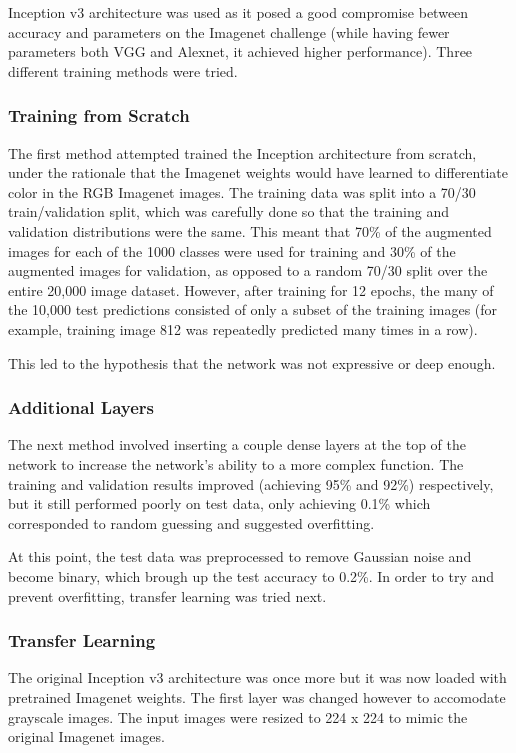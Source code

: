 \documentclass{article}
\begin{document}
Inception v3 architecture was used as it posed a good compromise between accuracy and parameters on the Imagenet challenge (while having fewer parameters both VGG and Alexnet, it achieved higher performance). Three different training methods were tried.

\subsubsection{Training from Scratch}

The first method attempted trained the Inception architecture from scratch, under the rationale that the Imagenet weights would have learned to differentiate color in the RGB Imagenet images. The training data was split into a 70/30 train/validation split, which was carefully done so that the training and validation distributions were the same. This meant that 70\% of the augmented images for each of the 1000 classes were used for training and 30\% of the augmented images for validation, as opposed to a random 70/30 split over the entire 20,000 image dataset. However, after training for 12 epochs, the many of the 10,000 test predictions consisted of only a subset of the training images (for example, training image 812 was repeatedly predicted many times in a row).

This led to the hypothesis that the network was not expressive or deep enough.

\subsubsection{Additional Layers}

The next method involved inserting a couple dense layers at the top of the network to increase the network's ability to a more complex function. The training and validation results improved (achieving 95\% and 92\%) respectively, but it still performed poorly on test data, only achieving 0.1\% which corresponded to random guessing and suggested overfitting.

At this point, the test data was preprocessed to remove Gaussian noise and become binary, which brough up the test accuracy to 0.2\%. In order to try and prevent overfitting, transfer learning was tried next.

\subsubsection{Transfer Learning}

The original Inception v3 architecture was once more but it was now loaded with pretrained Imagenet weights. The first layer was changed however to accomodate grayscale images. The input images were resized to 224 x 224 to mimic the original Imagenet images.
\end{document}
